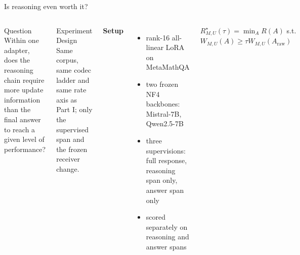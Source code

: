 \documentclass[aspectratio=169,10pt]{beamer}
\begin{document}
\begin{frame}{Is reasoning even worth it?}
\begin{columns}[T,onlytextwidth]
\begin{block}{Question}
Within one adapter, does the reasoning chain require more update information than the final answer to reach a given level of performance?
\end{block}
\vspace{0.2cm}
\begin{block}{Experiment Design}
\small Same corpus, same codec ladder and same rate axis as Part I; only the supervised span and the frozen receiver change.
\end{block}
\small
\textbf{Setup}
\begin{itemize}\setlength\itemsep{4pt}
  \item rank-16 all-linear LoRA on MetaMathQA
  \item two frozen NF4 backbones: Mistral-7B, Qwen2.5-7B
  \item three supervisions: full response, reasoning span only, answer span only
  \item scored separately on reasoning and answer spans
\end{itemize}
\vspace{0.2cm}
$R^{\star}_{M,U}(\tau)=\min_A R(A)$ s.t.\ $W_{M,U}(A)\ge\tau W_{M,U}(A_{\mathrm{raw}})$
\end{columns}
\end{frame}
\end{document}
